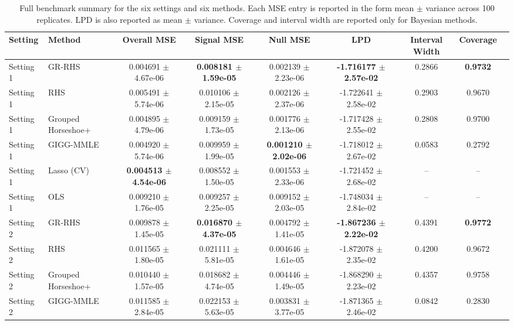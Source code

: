 \documentclass[11pt]{article}
\begin{document}
\begin{table}[p]
\centering
\caption{Full benchmark summary for the six settings and six methods. Each MSE
entry is reported in the form mean \(\pm\) variance across 100 replicates.
LPD is also reported as mean \(\pm\) variance. Coverage and interval width are
reported only for Bayesian methods.}
\label{tab:benchmark-full}
\begin{adjustbox}{max width=\textwidth}
\begin{tabular}{llccccccc}
\toprule
Setting & Method & Overall MSE & Signal MSE & Null MSE & LPD & Interval Width & Coverage \\
\midrule
Setting 1 & GR-RHS & 0.004691 $\pm$ 4.67e-06 & \textbf{0.008181 $\pm$ 1.59e-05} & 0.002139 $\pm$ 2.23e-06 & \textbf{-1.716177 $\pm$ 2.57e-02} & 0.2866 & \textbf{0.9732} \\
Setting 1 & RHS & 0.005491 $\pm$ 5.74e-06 & 0.010106 $\pm$ 2.15e-05 & 0.002126 $\pm$ 2.37e-06 & -1.722641 $\pm$ 2.58e-02 & 0.2903 & 0.9670 \\
Setting 1 & Grouped Horseshoe+ & 0.004895 $\pm$ 4.79e-06 & 0.009159 $\pm$ 1.73e-05 & 0.001776 $\pm$ 2.13e-06 & -1.717428 $\pm$ 2.55e-02 & 0.2808 & 0.9700 \\
Setting 1 & GIGG-MMLE & 0.004920 $\pm$ 5.74e-06 & 0.009959 $\pm$ 1.99e-05 & \textbf{0.001210 $\pm$ 2.02e-06} & -1.718012 $\pm$ 2.67e-02 & 0.0583 & 0.2792 \\
Setting 1 & Lasso (CV) & \textbf{0.004513 $\pm$ 4.54e-06} & 0.008552 $\pm$ 1.50e-05 & 0.001553 $\pm$ 2.33e-06 & -1.721452 $\pm$ 2.68e-02 & -- & -- \\
Setting 1 & OLS & 0.009210 $\pm$ 1.76e-05 & 0.009257 $\pm$ 2.25e-05 & 0.009152 $\pm$ 2.03e-05 & -1.748034 $\pm$ 2.84e-02 & -- & -- \\
\midrule
Setting 2 & GR-RHS & 0.009878 $\pm$ 1.45e-05 & \textbf{0.016870 $\pm$ 4.37e-05} & 0.004792 $\pm$ 1.41e-05 & \textbf{-1.867236 $\pm$ 2.22e-02} & 0.4391 & \textbf{0.9772} \\
Setting 2 & RHS & 0.011565 $\pm$ 1.80e-05 & 0.021111 $\pm$ 5.81e-05 & 0.004646 $\pm$ 1.61e-05 & -1.872078 $\pm$ 2.35e-02 & 0.4200 & 0.9672 \\
Setting 2 & Grouped Horseshoe+ & 0.010440 $\pm$ 1.57e-05 & 0.018682 $\pm$ 4.74e-05 & 0.004446 $\pm$ 1.49e-05 & -1.868290 $\pm$ 2.23e-02 & 0.4357 & 0.9758 \\
Setting 2 & GIGG-MMLE & 0.011585 $\pm$ 2.84e-05 & 0.022153 $\pm$ 5.63e-05 & 0.003831 $\pm$ 3.77e-05 & -1.871365 $\pm$ 2.46e-02 & 0.0842 & 0.2830 \\

\end{tabular}
\end{adjustbox}
\end{table}
\end{document}
